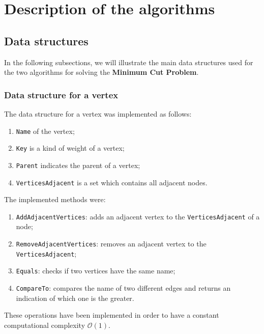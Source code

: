 \section{Description of the algorithms}

\subsection{Data structures}
In the following subsections, we will illustrate the main data structures used for the two algorithms for solving the \textbf{Minimum Cut Problem}.

\subsubsection{Data structure for a vertex}
The data structure for a vertex was implemented as follows:
\begin{enumerate}
    \item \verb|Name| of the vertex;
    \item \verb|Key| is a kind of weight of a vertex;
    \item \verb|Parent| indicates the parent of a vertex;
    \item \verb|VerticesAdjacent| is a set which contains all adjacent nodes.
\end{enumerate}
\noindent
The implemented methods were:
\begin{enumerate}
    \item \verb|AddAdjacentVertices|: adds an adjacent vertex to the \verb|VerticesAdjacent| of a node;
    \item \verb|RemoveAdjacentVertices|: removes an adjacent vertex to the \verb|VerticesAdjacent|;
    \item \verb|Equals|: checks if two vertices have the same name;
    \item \verb|CompareTo|: compares the name of two different edges and returns an indication of which one is the greater.
\end{enumerate}
These operations have been implemented in order to have a constant computational complexity $\mathcal{O}(1)$.

